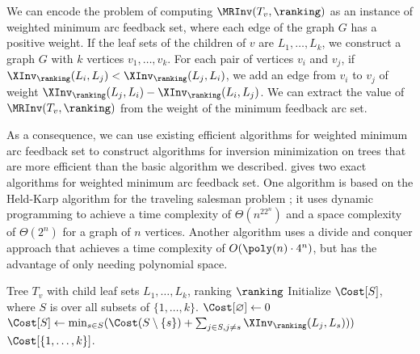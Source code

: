 \documentclass[11pt]{article}
\numberwithin{equation}{section}
\theoremstyle{definition}
\theoremstyle{plain}
\begin{document}
We can encode the problem of computing $\MRInv(T_v,\ranking)$ as an instance of weighted minimum arc feedback set, where each edge of the graph $G$ has a positive weight. If the leaf sets of the children of $v$ are $L_1,\dots,L_k$, we construct a graph $G$ with $k$ vertices $v_1,\dots,v_k$. For each pair of vertices $v_i$ and $v_j$, if $\XInv_\ranking(L_i,L_j)<\XInv_\ranking(L_j,L_i)$, we add an edge from $v_i$ to $v_j$ of weight $\XInv_\ranking(L_j,L_i)-\XInv_\ranking(L_i,L_j)$. We can extract the value of $\MRInv(T_v,\ranking)$ from the weight of the minimum feedback arc set.

As a consequence, we can use existing efficient algorithms for weighted minimum arc feedback set to construct algorithms for inversion minimization on trees that are more efficient than the basic algorithm we described. \cite{Bodlaender2011} gives two exact algorithms for weighted minimum arc feedback set. One algorithm {\cite[Algorithm 1]{Bodlaender2011}} is based on the Held-Karp algorithm for the traveling salesman problem \cite{HK62}; it uses dynamic programming to achieve a time complexity of $\Theta(n^22^n)$ and a space complexity of $\Theta(2^n)$ for a graph of $n$ vertices. Another algorithm {\cite[Algorithm 2]{Bodlaender2011}} uses a divide and conquer approach that achieves a time complexity of $O(\poly(n)\cdot 4^n)$, but has the advantage of only needing polynomial space.

%
%

\begin{algorithm}[ht]
    \caption{$\MRInv(T_v, \ranking)$, Dynamic Programming}\label{alg:MRInv-DP}
    \begin{algorithmic}
        \Require Tree $T_v$ with child leaf sets $L_1,\dots,L_k$, ranking $\ranking$
        \State Initialize $\Cost[S]$, where $S$ is over all subsets of $\{1,\dots,k\}$.
        \State $\Cost[\varnothing]\gets 0$
                \State $\Cost[S]\gets \min_{s\in S} (\Cost(S\setminus \{s\}) + \sum_{j\in S, j\neq s} \XInv_\ranking(L_{j}, L_{s})))$
            \EndFor
        \EndFor
        \State \Return $\Cost[\{1,\dots,k\}]$.
    \end{algorithmic}
\end{algorithm}
\end{document}
